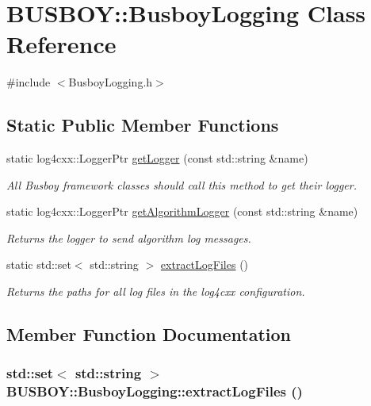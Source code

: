 \hypertarget{classBUSBOY_1_1BusboyLogging}{
\section{BUSBOY::BusboyLogging Class Reference}
\label{classBUSBOY_1_1BusboyLogging}
}


{\ttfamily \#include $<$BusboyLogging.h$>$}\subsection*{Static Public Member Functions}
\begin{DoxyCompactItemize}
\item 
static log4cxx::LoggerPtr \hyperlink{classBUSBOY_1_1BusboyLogging_aafe3f0190e28c0053b23368f93de255b}{getLogger} (const std::string \&name)
\begin{DoxyCompactList}\small\item\em All Busboy framework classes should call this method to get their logger. \item\end{DoxyCompactList}\item 
static log4cxx::LoggerPtr \hyperlink{classBUSBOY_1_1BusboyLogging_a429feabee73838517884e5ba2229ea9f}{getAlgorithmLogger} (const std::string \&name)
\begin{DoxyCompactList}\small\item\em Returns the logger to send algorithm log messages. \item\end{DoxyCompactList}\item 
static std::set$<$ std::string $>$ \hyperlink{classBUSBOY_1_1BusboyLogging_af896d8b674715e3e4adffd1ffa52bc41}{extractLogFiles} ()
\begin{DoxyCompactList}\small\item\em Returns the paths for all log files in the log4cxx configuration. \item\end{DoxyCompactList}\end{DoxyCompactItemize}


\subsection{Member Function Documentation}
\hypertarget{classBUSBOY_1_1BusboyLogging_af896d8b674715e3e4adffd1ffa52bc41}{
\subsubsection[{extractLogFiles}]{\setlength{\rightskip}{0pt plus 5cm}std::set$<$ std::string $>$ BUSBOY::BusboyLogging::extractLogFiles ()}}
\label{classBUSBOY_1_1BusboyLogging_af896d8b674715e3e4adffd1ffa52bc41}


